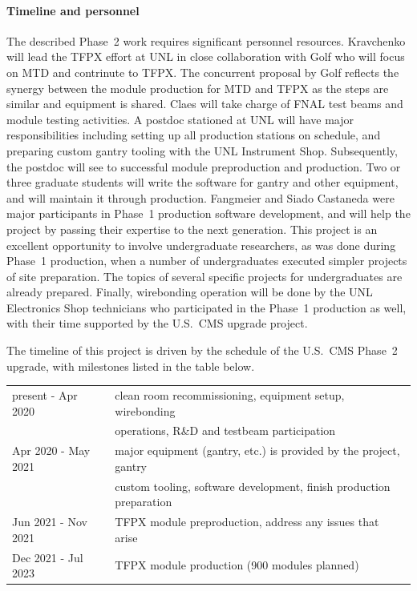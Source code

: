 \paragraph{Timeline and personnel}

The described Phase~2 work requires significant personnel resources. Kravchenko will lead the TFPX effort at UNL in close collaboration with Golf who will focus on MTD and contrinute to TFPX. The concurrent proposal by Golf reflects the synergy between the module production for MTD and TFPX as the steps are similar and equipment is shared. Claes will take charge of FNAL test beams and module testing activities. A postdoc stationed at UNL will have major responsibilities including setting up all production stations on schedule, and preparing custom gantry tooling with the UNL Instrument Shop.
Subsequently, the postdoc will see to successful module preproduction and production. Two or three graduate students will write the software for gantry and other equipment, and will maintain it through production. Fangmeier and Siado Castaneda were major participants in  Phase~1 production software development, and will help the project by passing their expertise to the next generation. This project is an excellent opportunity to involve undergraduate researchers, as was done during Phase~1 production, when a number of undergraduates executed simpler projects of site preparation. The topics of several specific projects for undergraduates are already prepared.
Finally,  wirebonding operation will be done by the UNL Electronics Shop technicians who participated in the Phase~1 production as well, with their time supported by the U.S.~CMS upgrade project.

The timeline of this project is driven by the schedule of the U.S.~CMS Phase~2 upgrade, with milestones listed in the table below.

\vspace{3mm}
\noindent
\begin{tabular}{l|l}
\hline
present - Apr 2020 & clean room recommissioning, equipment setup, wirebonding \\
        &  operations, R\&D and testbeam participation \\
Apr 2020 - May 2021 
         & major equipment (gantry, etc.) is provided by the project, gantry \\
         & custom tooling, software development, finish production preparation \\
Jun 2021 - Nov 2021
         & TFPX module preproduction, address any issues that arise \\
Dec 2021 - Jul 2023 
         &  TFPX module production (900 modules planned) \\
\hline
\end{tabular}

